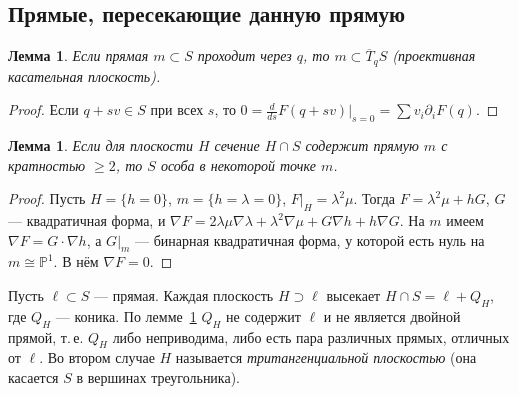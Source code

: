 \documentclass[11pt,a4paper]{article}
\theoremstyle{plain}
\newtheorem{lemma}[theorem]{Лемма}
\theoremstyle{definition}
\theoremstyle{remark}
\newcommand{\PP}{\mathbb{P}}
\begin{document}
\subsection{Прямые, пересекающие данную прямую}

\begin{lemma}\label{lem:tangent-line}
Если прямая $m\subset S$ проходит через $q$, то $m\subset\overline T_qS$ (проективная касательная плоскость).
\end{lemma}
\begin{proof}
Если $q+sv\in S$ при всех $s$, то $0=\frac{d}{ds}F(q+sv)|_{s=0}=\sum v_i\partial_iF(q)$.
\end{proof}

\begin{lemma}\label{lem:double-line}
Если для плоскости $H$ сечение $H\cap S$ содержит прямую $m$ с кратностью $\ge2$, то $S$ особа в некоторой
точке $m$.
\end{lemma}
\begin{proof}
Пусть $H=\{h=0\}$, $m=\{h=\lambda=0\}$, $F|_H=\lambda^2\mu$. Тогда $F=\lambda^2\mu+hG$, $G$ --- квадратичная
форма, и $\nabla F=2\lambda\mu\nabla\lambda+\lambda^2\nabla\mu+G\nabla h+h\nabla G$. На $m$ имеем
$\nabla F=G\cdot\nabla h$, а $G|_m$ --- бинарная квадратичная форма, у которой есть нуль на $m\cong\PP^1$. В нём
$\nabla F=0$.
\end{proof}

Пусть $\ell\subset S$ --- прямая. Каждая плоскость $H\supset\ell$ высекает $H\cap S=\ell+Q_H$, где $Q_H$ ---
коника. По лемме~\ref{lem:double-line} $Q_H$ не содержит $\ell$ и не является двойной прямой, т.\,е. $Q_H$ либо
неприводима, либо есть пара различных прямых, отличных от $\ell$. Во втором случае $H$ называется
\emph{тритангенциальной плоскостью} (она касается $S$ в вершинах треугольника).
\end{document}

